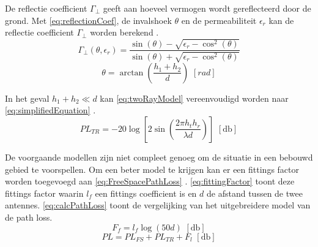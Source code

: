 De reflectie coefficient $\Gamma_\bot$ geeft aan hoeveel vermogen wordt gereflecteerd door de grond. Met \cref{eq:reflectionCoef}, de invalshoek $\theta$ en de permeabiliteit $\epsilon_r$ kan de reflectie coefficient $\Gamma_\bot$ worden berekend \cite{bacco2014uavs,sommer2012applicability}.
\begin{equation}\label{eq:reflectionCoef}
    \Gamma_\bot\left(\theta, \epsilon_r\right)=\frac{\sin\left(\theta\right)-\sqrt{\epsilon_r-\cos^2\left(\theta\right)}}{\sin\left(\theta\right)+\sqrt{\epsilon_r-\cos^2\left(\theta\right)}}
\end{equation}
\begin{equation}
    \theta=\arctan\left(\frac{h_1+h_2}{d}\right)\,\,\unit{\left[rad\right]}
\end{equation}

In het geval $h_1+h_2\ll d$ kan \cref{eq:twoRayModel} vereenvoudigd worden naar \cref{eq:simplifiedEquation} \cite{brini2019system}.
\begin{equation}\label{eq:simplifiedEquation}
    PL_{TR}=-20\log\left[2\sin\left(\frac{2\pi h_th_r}{\lambda d}\right)\right] \,\,\left[\unit{\decibel}\right]
\end{equation}

De voorgaande modellen zijn niet compleet genoeg om de situatie in een bebouwd gebied te voorspellen. Om een beter model te krijgen kan er een fittings factor worden toegevoegd aan \cref{eq:FreeSpacePathLoss} \cite[24]{brini2019system}. \autoref{eq:fittingFactor} toont deze fittings factor waarin \(l_f\) een fittings coefficient is en $d$ de afstand tussen de twee antennes. \autoref{eq:calcPathLoss} toont de vergelijking van het uitgebreidere model van de path loss.
\begin{equation} \label{eq:fittingFactor}
    F_f=l_f\log(50d) \,\,\left[\unit{\decibel}\right]
\end{equation}
\begin{equation}\label{eq:calcPathLoss}
    PL= PL_{FS}+PL_{TR}+F_l \,\,\left[\unit{\decibel}\right]
\end{equation}

